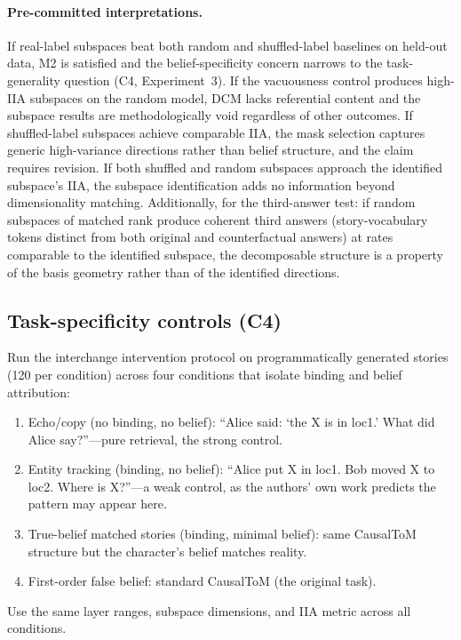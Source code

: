 \documentclass[11pt]{article}
\begin{document}
\paragraph{Pre-committed interpretations.} If real-label subspaces beat both random and shuffled-label baselines on held-out data, M2 is satisfied and the belief-specificity concern narrows to the task-generality question (C4, Experiment~3). If the vacuousness control produces high-IIA subspaces on the random model, DCM lacks referential content and the subspace results are methodologically void regardless of other outcomes. If shuffled-label subspaces achieve comparable IIA, the mask selection captures generic high-variance directions rather than belief structure, and the claim requires revision. If both shuffled and random subspaces approach the identified subspace's IIA, the subspace identification adds no information beyond dimensionality matching. Additionally, for the third-answer test: if random subspaces of matched rank produce coherent third answers (story-vocabulary tokens distinct from both original and counterfactual answers) at rates comparable to the identified subspace, the decomposable structure is a property of the basis geometry rather than of the identified directions.

\subsection{Task-specificity controls (C4)}

Run the interchange intervention protocol on programmatically generated stories (120 per condition) across four conditions that isolate binding and belief attribution:

\begin{enumerate}
\item Echo/copy (no binding, no belief): ``Alice said: `the X is in loc1.' What did Alice say?''---pure retrieval, the strong control.
\item Entity tracking (binding, no belief): ``Alice put X in loc1. Bob moved X to loc2. Where is X?''---a weak control, as the authors' own work predicts the pattern may appear here.
\item True-belief matched stories (binding, minimal belief): same CausalToM structure but the character's belief matches reality.
\item First-order false belief: standard CausalToM (the original task).
\end{enumerate}

Use the same layer ranges, subspace dimensions, and IIA metric across all conditions.
\end{document}
